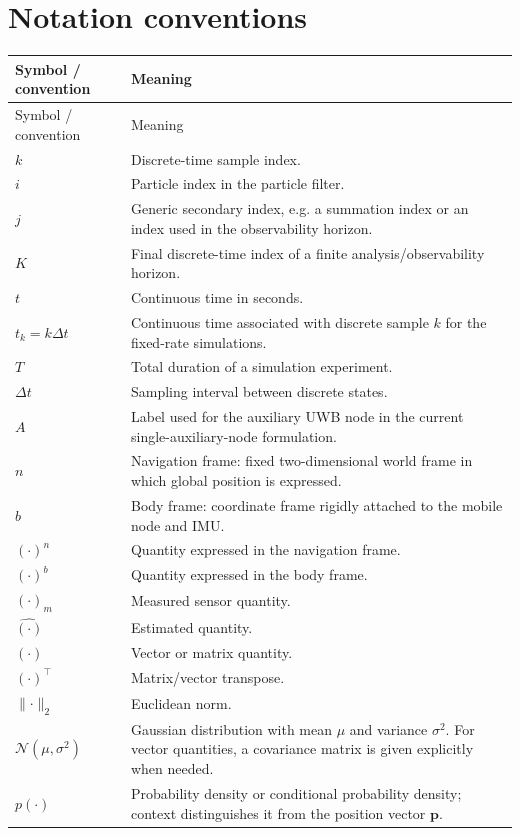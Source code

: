 \section*{Notation conventions}
\begin{longtable}{p{}p{}}
\toprule
Symbol / convention & Meaning\\
\midrule
\endfirsthead
\toprule
Symbol / convention & Meaning\\
\midrule
\endhead
$k$ & Discrete-time sample index.\\
$i$ & Particle index in the particle filter.\\
$j$ & Generic secondary index, e.g. a summation index or an index used in the observability horizon.\\
$K$ & Final discrete-time index of a finite analysis/observability horizon.\\
$t$ & Continuous time in seconds.\\
$t_k=k\Delta t$ & Continuous time associated with discrete sample $k$ for the fixed-rate simulations.\\
$T$ & Total duration of a simulation experiment.\\
$\Delta t$ & Sampling interval between discrete states.\\
$A$ & Label used for the auxiliary UWB node in the current single-auxiliary-node formulation.\\
$n$ & Navigation frame: fixed two-dimensional world frame in which global position is expressed.\\
$b$ & Body frame: coordinate frame rigidly attached to the mobile node and IMU.\\
$(\cdot)^n$ & Quantity expressed in the navigation frame.\\
$(\cdot)^b$ & Quantity expressed in the body frame.\\
$(\cdot)_m$ & Measured sensor quantity.\\
$\hat{(\cdot)}$ & Estimated quantity.\\
$\bm{(\cdot)}$ & Vector or matrix quantity.\\
$(\cdot)^\top$ & Matrix/vector transpose.\\
$\lVert\cdot\rVert_2$ & Euclidean norm.\\
$\mathcal{N}(\mu,\sigma^2)$ & Gaussian distribution with mean $\mu$ and variance $\sigma^2$. For vector quantities, a covariance matrix is given explicitly when needed.\\
$p(\cdot)$ & Probability density or conditional probability density; context distinguishes it from the position vector $\bm p$.\\

\end{longtable}
